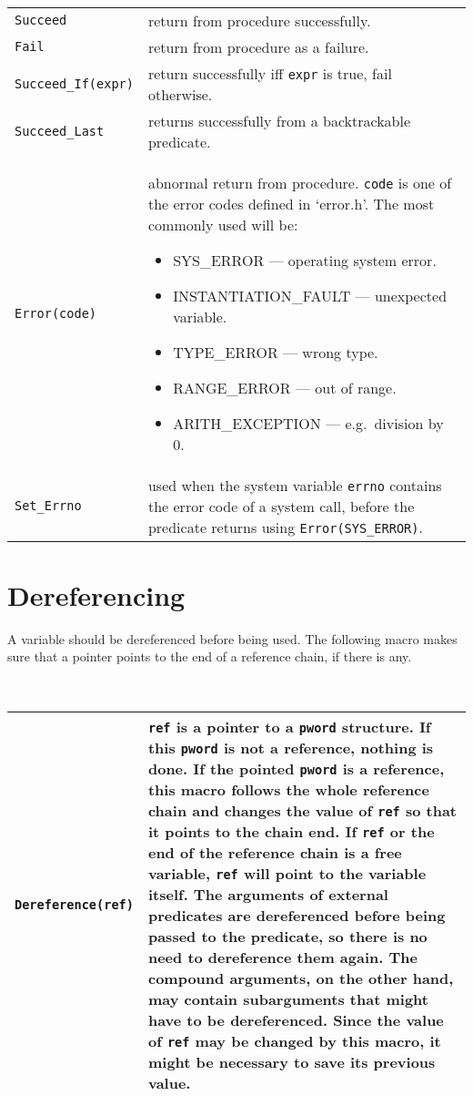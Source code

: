 \noindent
 \\
\begin{tabular}{|p{5cm}p{10cm}|} 
\hline
{\tt Succeed} & return from procedure successfully.\\  

{\tt Fail} & return from procedure as a failure.\\ 

{\tt Succeed_If(expr)} &
return successfully iff {\tt expr} is true, fail otherwise.\\

{\tt Succeed_Last} &
returns successfully from a backtrackable predicate.\\

{\tt Error(code)} &
abnormal return from procedure. {\tt code} is one of the
error codes defined in `error.h'. The most commonly used will be:
\begin{itemize}
\item SYS_ERROR --- operating system error.
\item INSTANTIATION_FAULT --- unexpected variable.
\item TYPE_ERROR --- wrong type.
\item RANGE_ERROR --- out of range.
\item ARITH_EXCEPTION --- e.g.\ division by 0.
\end{itemize}
\\

{\tt Set_Errno} &
used when the system variable {\tt errno} contains the error code
of a system call, before the predicate returns using
{\tt Error(SYS_ERROR)}.\\
\hline
\end{tabular}

\newpage

\section{Dereferencing}
A variable should be dereferenced before being used. The following
macro makes sure that a pointer points to the end of a reference
chain, if there is any.

\noindent
 \\
\begin{tabular}{|p{5cm}p{10cm}|} 
\hline
{\tt Dereference(ref)} & 
{\tt ref} is a pointer to a {\tt pword} structure.
If this {\tt pword} is not a reference,
nothing is done. If the pointed {\tt pword} is a reference, 
this macro follows 
the whole reference chain and changes the value of {\tt ref}
so that it points to the chain end.
If {\tt ref} or the end of the reference chain is a free variable, 
{\tt ref} will point to the variable itself. The arguments of
external predicates are dereferenced before being passed to the 
predicate, so there is no need to dereference them again.
The compound arguments, on the other hand, may contain
subarguments that might have to be dereferenced.
Since the value of {\tt ref} may be changed by this macro, it might
be necessary to save its previous value. \\
\hline
\end{tabular}

